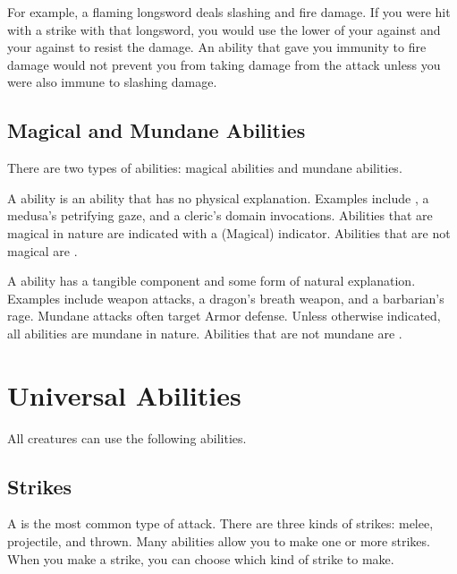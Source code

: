             For example, a flaming longsword deals slashing and fire damage.
            If you were hit with a strike with that longsword, you would use the lower of your  against  and your  against  to resist the damage.
            An ability that gave you immunity to fire damage would not prevent you from taking damage from the attack unless you were also immune to slashing damage.

    \subsection{Magical and Mundane Abilities}\label{Magical and Mundane Abilities}

        There are two types of abilities: magical abilities and mundane abilities.

        \label{Magical Abilities} A  ability is an ability that has no physical explanation.
        Examples include , a medusa's petrifying gaze, and a cleric's domain invocations.
        Abilities that are magical in nature are indicated with a (Magical) indicator.
        Abilities that are not magical are .

        \label{Mundane Abilities} A  ability has a tangible component and some form of natural explanation.
        Examples include weapon attacks, a dragon's breath weapon, and a barbarian's rage.
        Mundane attacks often target Armor defense.
        Unless otherwise indicated, all abilities are mundane in nature.
        Abilities that are not mundane are .

\section{Universal Abilities}\label{Universal Abilities}
    All creatures can use the following abilities.

    \subsection{Strikes}\label{Strikes}
        A  is the most common type of attack.
        There are three kinds of strikes: melee, projectile, and thrown.
        Many abilities allow you to make one or more strikes.
        When you make a strike, you can choose which kind of strike to make.

